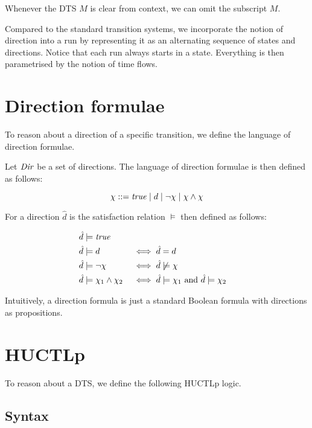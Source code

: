 Whenever the \ac{DTS} $M$ is clear from context, we can omit the subscript $M$.

Compared to the standard transition systems, we incorporate the notion of direction into a run by representing it as an alternating sequence of states and directions. Notice that each run always starts in a state. Everything is then parametrised by the notion of time flows.

\section{Direction formulae}

To reason about a direction of a specific transition, we define the language of direction formulae.

\begin{definition}
	Let $\mathit{Dir}$ be a set of directions. The language of direction formulae is then defined as follows:
	
	\[
	\chi ::= \mathit{true} \mid d \mid \neg\chi \mid \chi\wedge\chi
	\]
\end{definition}
For a direction $\hat d$ is the satisfaction relation $\models$ then defined as follows:

\begin{alignat*}{4}
	\hat d &\models \mathit{true} \\
	\hat d &\models d 								&&\iff \hat d = d \\
	\hat d &\models \neg\chi 					 &&\iff \hat d\not\models\chi \\
	\hat d &\models \chi_1 \land \chi_2 	 &&\iff \hat d\models\chi_1 \text{ and } \hat d\models\chi_2
\end{alignat*}

Intuitively, a direction formula is just a standard Boolean formula with directions as propositions.

\section{\Acl{HUCTLp}}

To reason about a \ac{DTS}, we define the following \ac{HUCTLp} logic.

\subsection{Syntax}

